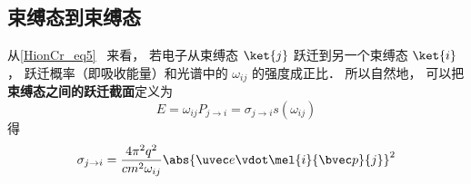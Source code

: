 
\begin{issues}
\issueDraft
\end{issues}


\subsection{束缚态到束缚态}
从\autoref{HionCr_eq5}~ 来看， 若电子从束缚态 $\ket{j}$ 跃迁到另一个束缚态 $\ket{i}$， 跃迁概率（即吸收能量）和光谱中的 $\omega_{ij}$ 的强度成正比． 所以自然地， 可以把\textbf{束缚态之间的跃迁截面}定义为
\begin{equation}
E = \omega_{ij}P_{j\to i} = \sigma_{j\to i} s(\omega_{ij})
\end{equation}
得 %
\begin{equation}
\sigma_{j\to i} = \frac{4\pi^2 q^2}{c m^2 \omega_{ij}} \abs{\uvec e \vdot\mel{i}{\bvec p}{j}}^2
\end{equation}

